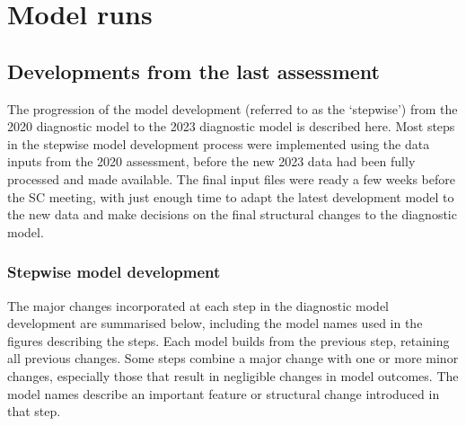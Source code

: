 
\section{Model runs}

\subsection{Developments from the last assessment}
\label{sec:stepwise}

The progression of the model development (referred to as the `stepwise') from the 2020 diagnostic model to the 2023 diagnostic model is described here. Most steps in the stepwise model development process were implemented using the data inputs from the 2020 assessment, before the new 2023 data had been fully processed and made available. The final input files were ready a few weeks before the SC meeting, with just enough time to adapt the latest development model to the new data and make decisions on the final structural changes to the diagnostic model.

\subsubsection{Stepwise model development}

The major changes incorporated at each step in the diagnostic model development are summarised below, including the model names used in the figures describing the steps. Each model builds from the previous step, retaining all previous changes. Some steps combine a major change with one or more minor changes, especially those that result in negligible changes in model outcomes. The model names describe an important feature or structural change introduced in that step.

